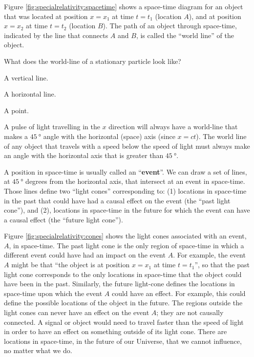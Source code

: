 Figure \ref{fig:specialrelativity:spacetime} shows a space-time diagram for an object that was located at position $x=x_1$ at time $t=t_1$ (location $A$), and at position $x=x_2$ at time $t=t_2$ (location $B$). The path of an object through space-time, indicated by the line that connects $A$ and $B$, is called the ``world line'' of the object.
\begin{checkpoint}{}
	\begin{MCquestion}{What does the world-line of a stationary particle look like?}
		\item A vertical line. \correct
		\item A horizontal line.
		\item A point.
	\end{MCquestion}
\end{checkpoint}
A pulse of light travelling in the $x$ direction will always have a world-line that makes a $\SI{45}{\degree}$ angle with the horizontal (space) axis (since $x=ct$). The world line of any object that travels with a speed below the speed of light must always make an angle with the horizontal axis that is greater than $\SI{45}{\degree}$.

A position in space-time is usually called an ``\textbf{event}''. We can draw a set of lines, at $\SI{45}{\degree}$ degrees from the horizontal axis, that intersect at an event in space-time. Those lines define two ``light cones'' corresponding to: (1) locations in space-time in the past that could have had a causal effect on the event (the ``past light cone''), and (2), locations in space-time in the future for which the event can have a causal effect (the ``future light cone'').

Figure \ref{fig:specialrelativity:cones} shows the light cones associated with an event, $A$, in space-time. The past light cone is the only region of space-time in which a different event could have had an impact on the event $A$. For example, the event $A$ might be that ``the object is at position $x=x_1$ at time $t=t_1$'', so that the past light cone corresponds to the only locations in space-time that the object could have been in the past. Similarly, the future light-cone defines the locations in space-time upon which the event $A$ could have an effect. For example, this could define the possible locations of the object in the future. The regions outside the light cones can never have an effect on the event $A$; they are not causally connected. A signal or object would need to travel faster than the speed of light in order to have an effect on something outside of its light cone. There are locations in space-time, in the future of our Universe, that we cannot influence, no matter what we do.

